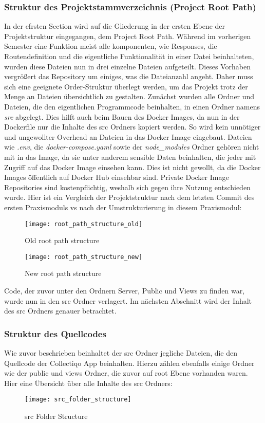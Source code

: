 \subsubsection{Struktur des Projektstammverzeichnis (Project Root Path)}
In der efrsten Section wird auf die Gliederung in der ersten Ebene der Projektstruktur eingegangen, dem Project Root Path.
Während im vorherigen Semester eine Funktion meist alle komponenten, wie Responses, die Routendefinition und die eigentliche Funktionalität in einer Datei beinhalteten, wurden diese Dateien nun in drei einzelne Dateien aufgeteilt.
Dieses Vorhaben vergrößert das Repository um einiges, was die Dateianzahl angeht.
Daher muss sich eine geeignete Order-Struktur überlegt werden, um das Projekt trotz der Menge an Dateien übersichtlich zu gestalten.
Zunächst wurden alle Ordner und Dateien, die den eigentlichen Programmcode beinhalten, in einen Ordner namens \textit{src} abgelegt.
Dies hilft auch beim Bauen des Docker Images, da nun in der Dockerfile nur die Inhalte des src Ordners kopiert werden.
So wird kein unnötiger und ungewollter Overhead an Dateien in das Docker Image eingebaut.
Dateien wie \textit{.env}, die \textit{docker-compose.yaml} sowie der \textit{node_modules} Ordner gehören nicht mit in das Image, da sie unter anderem sensible Daten beinhalten, die jeder mit Zugriff auf das Docker Image einsehen kann.
Dies ist nicht gewollt, da die Docker Images öffentlich auf Docker Hub einsehbar sind.
Private Docker Image Repositories sind kostenpflichtig, weshalb sich gegen ihre Nutzung entschieden wurde.
Hier ist ein Vergleich der Projektstruktur nach dem letzten Commit des ersten Praxismoduls vs nach der Umstrukturierung in diesem Praxismodul:
\begin{figure}[h]
  \centering
  \texttt{[image: root\_path\_structure\_old]}
  \caption{Old root path structure}
  \label{fig:root_path_structure_old}
\end{figure}
\begin{figure}[h]
  \centering
  \texttt{[image: root\_path\_structure\_new]}
  \caption{New root path structure}
  \label{fig:root_path_strucutr_new}
\end{figure}
Code, der zuvor unter den Ordnern Server, Public und Views zu finden war, wurde nun in den src Ordner verlagert.
Im nächsten Abschnitt wird der Inhalt des src Ordners genauer betrachtet.

\subsubsection{Struktur des Quellcodes}
Wie zuvor beschrieben beinhaltet der src Ordner jegliche Dateien, die den Quellcode der Collectiqo App beinhalten.
Hierzu zählen ebenfalls einige Ordner wie der public und views Ordner, die zuvor auf root Ebene vorhanden waren.
Hier eine Übersicht über alle Inhalte des src Ordners:
\begin{figure}[h]
  \centering
  \texttt{[image: src\_folder\_structure]}
  \caption{src Folder Structure}
  \label{fig:src_folder_structure}
\end{figure}


